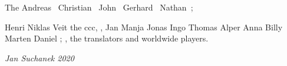 \raggedright

\noindent The 
Andreas~
Chris\-tian~
John~
Gerhard~
Nathan~;

Henri 
Niklas 
Veit 
the ccc,
, 
Jan 
Manja 
Jonas 
Ingo 
Thomas 
Alper 
Anna 
Billy 
Marten 
Daniel ;
,
\noindent the translators
and 
worldwide players.

\medskip
\hfill \emph{Jan Suchanek 2020}